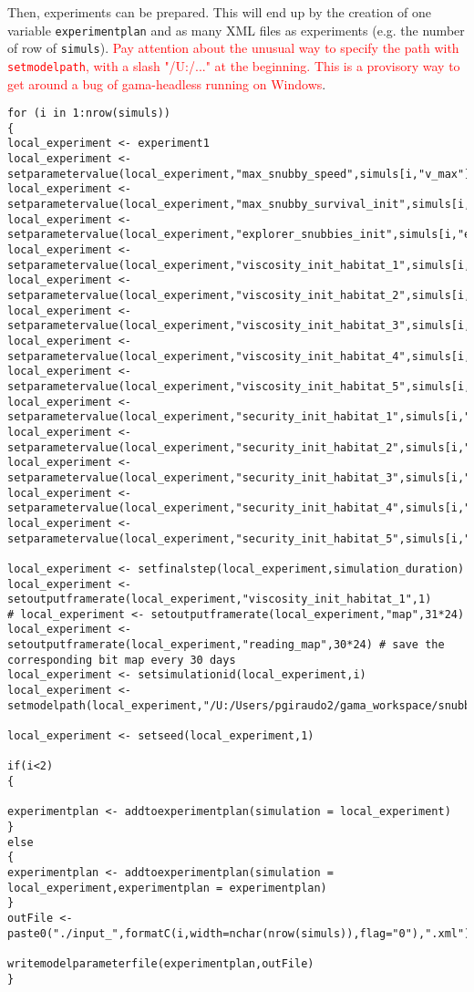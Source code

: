 Then, experiments can be prepared. This will end up by the creation of one variable \texttt{experimentplan} and as many XML files as experiments (e.g. the number of row of \texttt{simuls}). \textcolor{red}{Pay attention about the unusual way to specify the path with \texttt{setmodelpath}, with a slash "/U:/..." at the beginning. This is a provisory way to get around a bug of gama-headless running on Windows}.

\begin{lstlisting}
for (i in 1:nrow(simuls))
{
local_experiment <- experiment1
local_experiment <-  setparametervalue(local_experiment,"max_snubby_speed",simuls[i,"v_max"])
local_experiment <-  setparametervalue(local_experiment,"max_snubby_survival_init",simuls[i,"s_max"])
local_experiment <-  setparametervalue(local_experiment,"explorer_snubbies_init",simuls[i,"explorer_snubbies"])
local_experiment <-  setparametervalue(local_experiment,"viscosity_init_habitat_1",simuls[i,"viscosity_factor_habitat_1"])
local_experiment <-  setparametervalue(local_experiment,"viscosity_init_habitat_2",simuls[i,"viscosity_factor_habitat_2"])
local_experiment <-  setparametervalue(local_experiment,"viscosity_init_habitat_3",simuls[i,"viscosity_factor_habitat_3"])
local_experiment <-  setparametervalue(local_experiment,"viscosity_init_habitat_4",simuls[i,"viscosity_factor_habitat_4"])
local_experiment <-  setparametervalue(local_experiment,"viscosity_init_habitat_5",simuls[i,"viscosity_factor_habitat_5"])
local_experiment <-  setparametervalue(local_experiment,"security_init_habitat_1",simuls[i,"security_factor_habitat_1"])
local_experiment <-  setparametervalue(local_experiment,"security_init_habitat_2",simuls[i,"security_factor_habitat_2"])
local_experiment <-  setparametervalue(local_experiment,"security_init_habitat_3",simuls[i,"security_factor_habitat_3"])
local_experiment <-  setparametervalue(local_experiment,"security_init_habitat_4",simuls[i,"security_factor_habitat_4"])
local_experiment <-  setparametervalue(local_experiment,"security_init_habitat_5",simuls[i,"security_factor_habitat_5"])

local_experiment <- setfinalstep(local_experiment,simulation_duration)
local_experiment <- setoutputframerate(local_experiment,"viscosity_init_habitat_1",1)
# local_experiment <- setoutputframerate(local_experiment,"map",31*24)
local_experiment <- setoutputframerate(local_experiment,"reading_map",30*24) # save the corresponding bit map every 30 days
local_experiment <- setsimulationid(local_experiment,i)
local_experiment <- setmodelpath(local_experiment,"/U:/Users/pgiraudo2/gama_workspace/snubbies/models/snubbies.gaml")

local_experiment <- setseed(local_experiment,1)

if(i<2)
{

experimentplan <- addtoexperimentplan(simulation = local_experiment)
}
else
{
experimentplan <- addtoexperimentplan(simulation = local_experiment,experimentplan = experimentplan)
}
outFile <- paste0("./input_",formatC(i,width=nchar(nrow(simuls)),flag="0"),".xml")

writemodelparameterfile(experimentplan,outFile)
}

\end{lstlisting}

